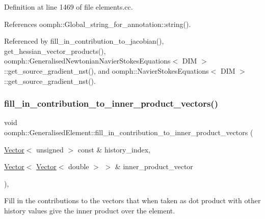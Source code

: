 Definition at line 1469 of file elements.\+cc.



References oomph\+::\+Global\+\_\+string\+\_\+for\+\_\+annotation\+::string().



Referenced by fill\+\_\+in\+\_\+contribution\+\_\+to\+\_\+jacobian(), get\+\_\+hessian\+\_\+vector\+\_\+products(), oomph\+::\+Generalised\+Newtonian\+Navier\+Stokes\+Equations$<$ D\+I\+M $>$\+::get\+\_\+source\+\_\+gradient\+\_\+nst(), and oomph\+::\+Navier\+Stokes\+Equations$<$ D\+I\+M $>$\+::get\+\_\+source\+\_\+gradient\+\_\+nst().

\mbox{\label{classoomph_1_1GeneralisedElement_aa7bd5d890614037d1023aae753a66957}} 
\subsubsection{\texorpdfstring{fill\+\_\+in\+\_\+contribution\+\_\+to\+\_\+inner\+\_\+product\+\_\+vectors()}{fill\_in\_contribution\_to\_inner\_product\_vectors()}}
{\footnotesize\ttfamily void oomph\+::\+Generalised\+Element\+::fill\+\_\+in\+\_\+contribution\+\_\+to\+\_\+inner\+\_\+product\+\_\+vectors (\begin{DoxyParamCaption}\item[{\hyperlink{classoomph_1_1Vector}{Vector}$<$ unsigned $>$ const \&}]{history\+\_\+index,  }\item[{\hyperlink{classoomph_1_1Vector}{Vector}$<$ \hyperlink{classoomph_1_1Vector}{Vector}$<$ double $>$ $>$ \&}]{inner\+\_\+product\+\_\+vector }\end{DoxyParamCaption})\hspace{0.3cm}{\ttfamily [protected]}, {\ttfamily [virtual]}}



Fill in the contributions to the vectors that when taken as dot product with other history values give the inner product over the element. 



